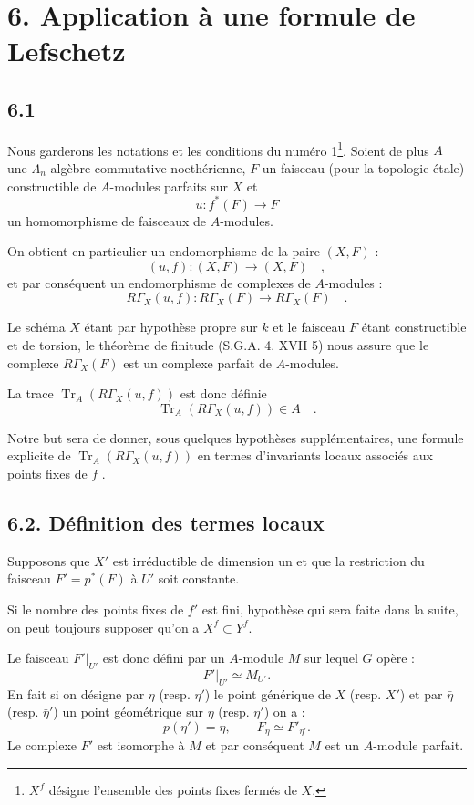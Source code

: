 \documentclass[11pt]{article}
\providecommand{\Tr}{\operatorname{Tr}}
\providecommand{\Tr}{\operatorname{Tr}}
\providecommand{\Tr}{\operatorname{Tr}}
\providecommand{\Tr}{\operatorname{Tr}}
\providecommand{\La}{\Lambda}
\providecommand{\Tr}{\operatorname{Tr}}
\begin{document}
\section*{6. Application à une formule de Lefschetz}

\subsection*{6.1}
Nous garderons les notations et les conditions du numéro 1\footnote{$X^f$ désigne l'ensemble des points fixes fermés de $X$.}. Soient de plus $A$ une $\La_n$-algèbre commutative noethérienne, $F$ un faisceau (pour la topologie étale) constructible de $A$-modules parfaits sur $X$ et
\[
u : f^*(F) \longrightarrow F
\]
un homomorphisme de faisceaux de $A$-modules.

On obtient en particulier un endomorphisme de la paire $(X, F)$ :
\[
(u, f) : (X, F) \longrightarrow (X, F) \quad ,
\]
et par conséquent un endomorphisme de complexes de $A$-modules :
\[
R\Gamma_X(u, f) : R\Gamma_X(F) \longrightarrow R\Gamma_X(F) \quad .
\]

Le schéma $X$ étant par hypothèse propre sur $k$ et le faisceau $F$ étant constructible et de torsion, le théorème de finitude (S.G.A. 4. XVII 5) nous assure que le complexe $R\Gamma_X(F)$ est un complexe parfait de $A$-modules.

La trace $\Tr_A(R\Gamma_X(u, f))$ est donc définie
\[
\Tr_A(R\Gamma_X(u, f)) \in A \quad .
\]

Notre but sera de donner, sous quelques hypothèses supplémentaires, une formule explicite de $\Tr_A(R\Gamma_X(u, f))$ en termes d'invariants locaux associés aux points fixes de $f$ .

\bigskip

\subsection*{6.2. Définition des termes locaux}
Supposons que $X'$ est irréductible de dimension un et que la restriction du faisceau $F'=p^*(F)$ à $U'$ soit constante.

Si le nombre des points fixes de $f'$ est fini, hypothèse qui sera faite dans la suite, on peut toujours supposer qu'on a $X^f \subset Y^f$.

Le faisceau $F'|_{U'}$ est donc défini par un $A$-module $M$ sur lequel $G$ opère :
\[
F'|_{U'} \simeq M_{U'} .
\]
En fait si on désigne par $\eta$ (resp. $\eta'$) le point générique de $X$ (resp. $X'$) et par $\bar\eta$ (resp. $\bar\eta'$) un point géométrique sur $\eta$ (resp. $\eta'$) on a :
\[
p(\eta')=\eta,\qquad F_{\bar\eta} \simeq F'_{\bar\eta'} .
\]
Le complexe $F'$ est isomorphe à $M$ et par conséquent $M$ est un $A$-module parfait.
\end{document}
